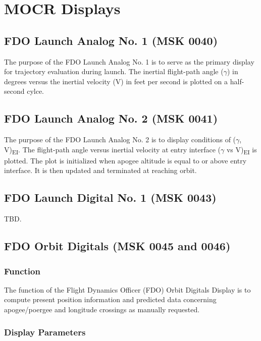 \documentclass[11pt]{article} %
\begin{document}
\section{MOCR Displays}

\subsection{FDO Launch Analog No. 1 (MSK 0040)}

The purpose of the FDO Launch Analog No. 1 is to serve as the primary display for trajectory evaluation during launch. The inertial flight-path angle ($\gamma$) in degrees versus the inertial velocity (V) in feet per second is plotted on a half-second cylce.\\

\subsection{FDO Launch Analog No. 2 (MSK 0041)}

The purpose of the FDO Launch Analog No. 2 is to display conditions of ($\gamma$, V)\textsubscript{EI}. The flight-path angle versus inertial velocity at entry interface ($\gamma$ vs V)\textsubscript{EI} is plotted. The plot is initialized when apogee altitude is equal to or above entry interface. It is then updated and terminated at reaching orbit.\\

\subsection{FDO Launch Digital No. 1 (MSK 0043)}

TBD.

\subsection{FDO Orbit Digitals (MSK 0045 and 0046)}

\subsubsection{Function}

The function of the Flight Dynamics Officer (FDO) Orbit Digitals Display is to compute present position information and predicted data concerning apogee/poergee and longitude crossings as manually requested.\\
\newpage
\subsubsection{Display Parameters}
\end{document}
